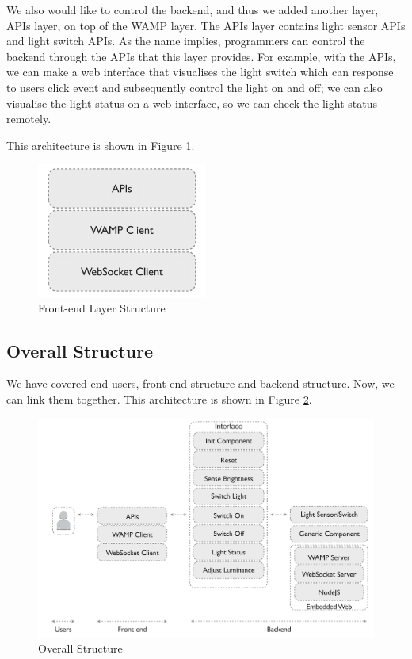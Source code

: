 We also would like to control the backend, and thus we added another layer, APIs layer, on top of the WAMP layer. The APIs layer contains light sensor APIs and light switch APIs. As the name implies, programmers can control the backend through the APIs that this layer provides. For example, with the APIs, we can make a web interface that visualises the light switch which can response to users click event and subsequently control the light on and off; we can also visualise the light status on a web interface, so we can check the light status remotely. 

This architecture is shown in Figure \ref{fig:front-end-layer-structure}.

\begin{figure}[ht]
  \begin{center}
    \includegraphics[width=0.5\textwidth]{images/front-end-layer-structure.pdf}
    \caption{Front-end Layer Structure}
    \label{fig:front-end-layer-structure}
  \end{center}
\end{figure}

\subsection{Overall Structure}
We have covered end users, front-end structure and backend structure. Now, we can link them together. This architecture is shown in Figure \ref{fig:communication-structure-with-user}.

\begin{figure}[ht]
  \begin{center}
    \includegraphics[width=1\textwidth]{images/communication-structure-with-user.pdf}
    \caption{Overall Structure}
    \label{fig:communication-structure-with-user}
  \end{center}
\end{figure}

